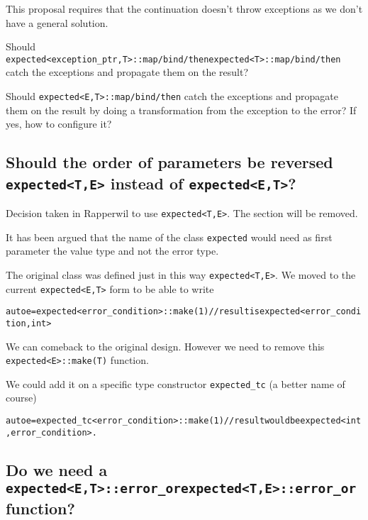 \documentclass[a4paper,10pt]{article}
\newcommand{\cpp}[1]{\lstinline{#1}}
\newcommand{\suppress}[1]{\colorbox{suppress_color}{#1}}
\newcommand{\update}[1]{\colorbox{update_color}{#1}}
\begin{document}
This proposal requires that the continuation doesn't throw exceptions as we don't have a general solution.

Should  \suppress{\cpp{expected<exception_ptr,T>::map/bind/then}}\update{\cpp{expected<T>::map/bind/then}} catch the exceptions and propagate them on the result?

Should  \cpp{expected<E,T>::map/bind/then} catch the exceptions and propagate them on the result by doing a transformation from the exception to the error? If yes, how to configure it?

\subsection{\suppress{Should the order of parameters be reversed \cpp{expected<T,E>} instead of \cpp{expected<E,T>}?}}

\update{Decision taken in Rapperwil to use \cpp{expected<T,E>}. The section will be removed.}

\suppress{It has been argued that the name of the class \cpp{expected} would need as first parameter the value type and not the error type.}

\suppress{The original class was defined just in this way \cpp{expected<T,E>}. We moved to the current \cpp{expected<E,T>} form to be able to write}

\begin{alltt}
\suppress{auto e  = expected<error_condition>::make(1) // result is expected<error_condition, int>}
\end{alltt}

\noindent
\suppress{We can comeback to the original design. However we need to remove this \cpp{expected<E>::make(T)} function. }

\suppress{We could add it on a specific type constructor \cpp{expected_tc} (a better name of course)}

\begin{alltt}
\suppress{auto e  = expected_tc<error_condition>::make(1) // result would be expected<int, error_condition>.}
\end{alltt}

\subsection{Do we need a  \suppress{\cpp{expected<E,T>::error_or}}\update{\cpp{expected<T,E>::error_or}} function?}
\end{document}

